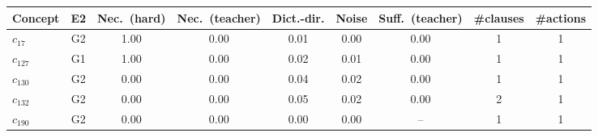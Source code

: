 \begin{tabular}{lcccccccc}
\toprule
Concept & E2 & Nec.\ (hard) & Nec.\ (teacher) & Dict.-dir. & Noise & Suff.\ (teacher) & \#clauses & \#actions \\
\midrule
$c_{17}$ & G2 & 1.00 & 0.00 & 0.01 & 0.00 & 0.00 & 1 & 1 \\
$c_{127}$ & G1 & 1.00 & 0.00 & 0.02 & 0.01 & 0.00 & 1 & 1 \\
$c_{130}$ & G2 & 0.00 & 0.00 & 0.04 & 0.02 & 0.00 & 1 & 1 \\
$c_{132}$ & G2 & 0.00 & 0.00 & 0.05 & 0.02 & 0.00 & 2 & 1 \\
$c_{190}$ & G2 & 0.00 & 0.00 & 0.00 & 0.00 & -- & 1 & 1 \\
\bottomrule
\end{tabular}